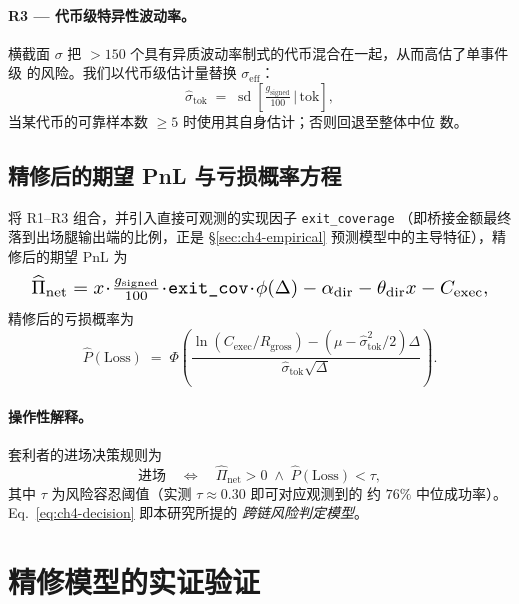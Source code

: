 \documentclass[sigconf,nonacm,10pt]{acmart}
\newcommand{\gsigned}{g_{\text{signed}}}
\newcommand{\Cexec}{C_{\text{exec}}}
\newcommand{\Rgross}{R_{\text{gross}}}
\begin{document}
\paragraph{R3 --- 代币级特异性波动率。} 横截面 $\sigma$ 把
$>\!150$ 个具有异质波动率制式的代币混合在一起，从而高估了单事件级
的风险。我们以代币级估计量替换 $\sigma_{\text{eff}}$：
\begin{equation}
\label{eq:ch4-sigma-token}
    \hat\sigma_{\text{tok}} \;=\;
    \operatorname{sd}\!\left[\tfrac{g_{\text{signed}}}{100}\,
    \Big|\,\text{tok}\right],
\end{equation}
当某代币的可靠样本数 $\geq 5$ 时使用其自身估计；否则回退至整体中位
数。

\subsection{精修后的期望 PnL 与亏损概率方程}

将 R1--R3 组合，并引入直接可观测的实现因子 \texttt{exit\_coverage}
（即桥接金额最终落到出场腿输出端的比例，正是 \S\ref{sec:ch4-empirical}
预测模型中的主导特征），精修后的期望 PnL 为
\begin{equation}
\label{eq:ch4-pi-hat}
\resizebox{0.95\columnwidth}{!}{$
    \widehat{\Pi}_{\text{net}} =
    x\!\cdot\!\tfrac{\gsigned}{100}\!\cdot\!\texttt{exit\_cov}\!\cdot\!\phi(\Delta)
    - \alpha_{\text{dir}} - \theta_{\text{dir}} x - \Cexec,
$}
\end{equation}
精修后的亏损概率为
\begin{equation}
\label{eq:ch4-ploss-new}
    \widehat{P}(\text{Loss}) \;=\;
    \Phi\!\left(\frac{\ln(\Cexec/\Rgross) -
        (\mu - \hat\sigma_{\text{tok}}^{2}/2)\Delta}
        {\hat\sigma_{\text{tok}}\sqrt{\Delta}}\right).
\end{equation}

\paragraph{操作性解释。} 套利者的进场决策规则为
\begin{equation}
    \label{eq:ch4-decision}
    \text{进场}
    \quad\Longleftrightarrow\quad
    \widehat{\Pi}_{\text{net}} > 0 \;\wedge\; \widehat{P}(\text{Loss}) < \tau,
\end{equation}
其中 $\tau$ 为风险容忍阈值（实测 $\tau \approx 0.30$ 即可对应观测到的
约 $76\%$ 中位成功率）。Eq.~\eqref{eq:ch4-decision} 即本研究所提的
\textit{跨链风险判定模型}。

\section{精修模型的实证验证}
\label{sec:ch4-validation}
\end{document}
